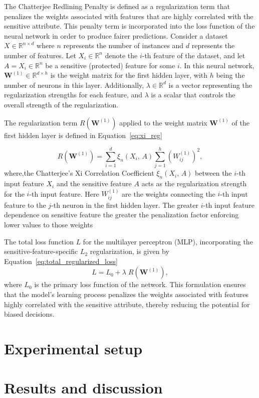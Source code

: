 The Chatterjee Redlining Penalty is defined as a regularization term that penalizes the weights associated with features that are highly correlated with the sensitive attribute. This penalty term is incorporated into the loss function of the neural network in order to produce fairer predictions. Consider a dataset \(X \in \mathbb{R}^{n \times d}\) where \(n\) represents the number of instances and \(d\) represents the number of features. Let \(X_i \in \mathbb{R}^n\) denote the \(i\)-th feature of the dataset, and let \(A = X_i \in \mathbb{R}^n\) be a sensitive (protected) feature for some \(i\). In this neural network, \(\mathbf{W}^{(1)} \in \mathbb{R}^{d \times h}\) is the weight matrix for the first hidden layer, with \(h\) being the number of neurons in this layer. Additionally, \(\lambda \in \mathbb{R}^d\) is a vector representing the regularization strengths for each feature, and $\lambda$ is a scalar that controls the overall strength of the regularization.



The regularization term \(R(\mathbf{W}^{(1)})\) applied to the weight matrix \(\mathbf{W}^{(1)}\) of the first hidden layer is defined in Equation~\ref{eq:xi_reg}

\begin{equation}\label{eq:xi_reg}
R(\mathbf{W}^{(1)}) = \sum_{i=1}^d \xi_n(X_i,\,A) \sum_{j=1}^h (W^{(1)}_{ij})^2,
\end{equation}
where,the Chatterjee's Xi Correlation Coefficient  $\xi_n(X_i,\,A)$  between the $i$-th input feature $X_i$ and the sensitive feature $A$ acts as the regularization strength for the $i$-th input feature. Here $W^{(1)}_{ij}$ are the weights connecting the $i$-th input feature to the $j$-th neuron in the first hidden layer. The greater $i$-th input feature dependence on sensitive feature the greater the penalization factor enforcing lower values to those weights

The total loss function \(L\) for the multilayer perceptron (MLP), incorporating the sensitive-feature-specific \(L_2\) regularization, is given by Equation~\ref{eq:total_regularized_loss}
\begin{equation}\label{eq:total_regularized_loss}
L = L_0 + \lambda \; R(\mathbf{W}^{(1)}),
\end{equation}
where $L_0$ is the primary loss function of the network. This formulation ensures that the model's learning process penalizes the weights associated with features highly correlated with the sensitive attribute, thereby reducing the potential for biased decisions.


\section{Experimental setup}

\section{Results and discussion}

